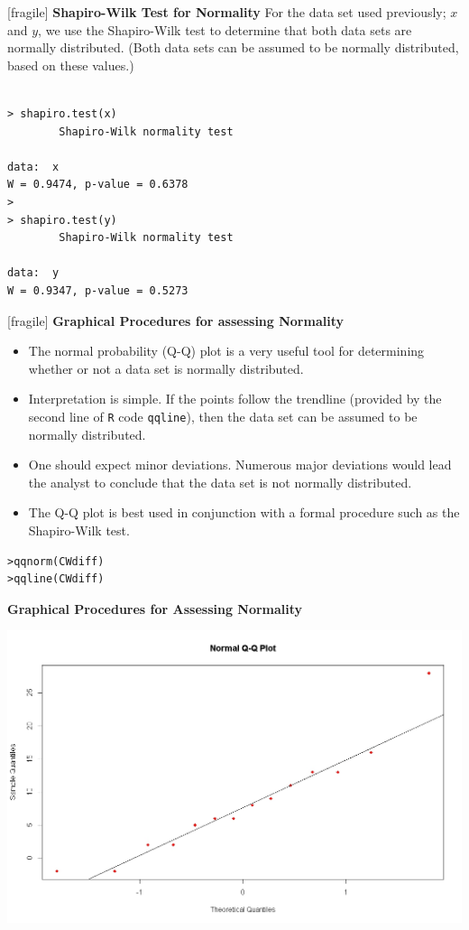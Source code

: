 \documentclass[a4]{beamer}
\begin{document}
[fragile]
\noindent \textbf{Shapiro-Wilk Test for Normality}
For the data set used previously; $x$ and $y$, we use the Shapiro-Wilk test to determine that both data sets are normally distributed.
(Both data sets can be assumed to be normally distributed, based on these values.)
\begin{verbatim}

> shapiro.test(x)
        Shapiro-Wilk normality test

data:  x
W = 0.9474, p-value = 0.6378
>
> shapiro.test(y)
        Shapiro-Wilk normality test

data:  y
W = 0.9347, p-value = 0.5273
\end{verbatim}




[fragile]
\noindent \textbf{Graphical Procedures for assessing Normality}

\begin{itemize}
\item The normal probability (Q-Q) plot is a very useful tool for determining whether or not a data set is normally distributed.
\item Interpretation is simple. If the points follow the trendline (provided by the second line of \texttt{R} code \texttt{qqline}), then the data set can be assumed to be normally distributed.
\item One should expect minor deviations. Numerous major deviations would lead the analyst to conclude that the data set is not normally distributed.
\item The Q-Q plot is best used in conjunction with a formal procedure such as the Shapiro-Wilk test.
\end{itemize}

\begin{verbatim}
>qqnorm(CWdiff)
>qqline(CWdiff)
\end{verbatim}





\noindent \textbf{Graphical Procedures for Assessing Normality}

\begin{center}
\includegraphics[scale=0.32]{10AQQplot}
\end{center}
\end{document}
